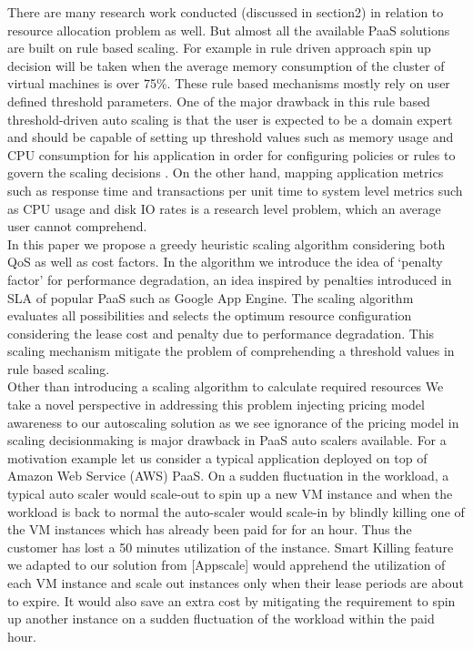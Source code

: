 There are many research work conducted (discussed in section2) in relation to resource allocation problem as well. But almost all the available PaaS solutions are built on rule based scaling. For example in rule driven approach spin up decision will be taken when the average memory consumption of the cluster of virtual machines is over 75\%. These rule based mechanisms mostly rely on user defined threshold parameters. One of the major drawback in this rule based threshold-driven auto scaling is that the user is expected to be a domain expert and should be capable of setting up threshold values such as memory usage and CPU consumption for his application in order for configuring policies or rules to govern the scaling decisions \cite{modeldriven}. On the other hand, mapping application metrics such as response time and transactions per unit time to system level metrics such as CPU usage and disk IO rates is a research level problem, which an average user cannot comprehend. \\

In this paper we propose a greedy heuristic scaling algorithm considering both QoS as well as cost factors. In the algorithm we introduce the idea of ‘penalty factor’ for performance degradation, an idea inspired by penalties introduced in SLA of popular PaaS such as Google App Engine. The scaling algorithm evaluates all possibilities and selects the optimum resource configuration considering the lease cost and penalty due to performance degradation. This scaling mechanism mitigate the problem of comprehending a threshold values in rule based scaling. \\

Other than introducing a scaling algorithm to calculate  required resources We take a novel perspective in addressing this problem injecting pricing model awareness to our autoscaling solution as we see ignorance of the pricing model in scaling decisionmaking  is major drawback in PaaS auto scalers available. For a motivation example let us consider a typical application deployed on top of Amazon Web Service (AWS) PaaS. On a sudden fluctuation in the workload, a typical auto scaler would scale-out to spin up a new VM instance and when the workload is back to normal the auto-scaler would scale-in by blindly killing one of the VM instances which has already been paid for for an hour. Thus the customer has lost a 50 minutes utilization of the instance. Smart Killing feature we adapted to our solution from [Appscale] would apprehend the utilization of each VM instance and scale out instances only when their lease periods are about to expire. It would also save an extra cost by mitigating the requirement to spin up another instance on a sudden fluctuation of the workload within the paid hour. \\

